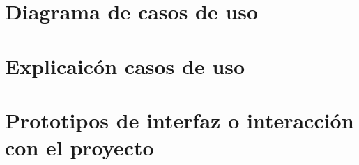 
\section{Diagrama de casos de uso}

\section{Explicaicón casos de uso}

\section{Prototipos de interfaz o interacción con el proyecto}
